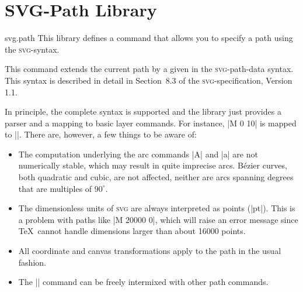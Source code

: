 %
%
%


\section{SVG-Path Library}
\label{section-library-svg-path}

\begin{pgflibrary}{svg.path}
  This library defines a command that allows you to specify a path
  using the \textsc{svg}-syntax.
\end{pgflibrary}

\begin{command}{\pgfpathsvg{}}
  This command extends the current path by a  given in the
  \textsc{svg}-path-data syntax. This syntax is described in detail in
  Section~8.3 of the \textsc{svg}-specification, Version 1.1.

  In principle, the complete syntax is supported and the library just
  provides a parser and a mapping to basic layer commands. For
  instance, |M 0 10| is mapped to
  |\pgfpathmoveto{\pgfpoint{0pt}{10pt}}|. There are, however, a few things
  to be aware of:
  \begin{itemize}
  \item The computation underlying the arc commands |A| and |a| are not
      numerically stable, which may result in quite imprecise arcs. Bézier
      curves, both quadratic and cubic, are not affected, neither are arcs
      spanning degrees that are multiples of $90^{\circ}$.
  \item The dimensionless units of \textsc{svg} are always interpreted
    as points (|pt|). This is a problem with paths like |M 20000 0|,
    which will raise an error message since \TeX\ cannot handle
    dimensions larger than about 16000 points.
  \item
    All coordinate and canvas transformations apply to the path in the
    usual fashion.
  \item
    The |\pgfpathsvg| command can be freely intermixed with other path
    commands.
  \end{itemize}
\begin{codeexample}[]
\begin{pgfpicture}
\end{pgfpicture}
\end{codeexample}
\end{command}

